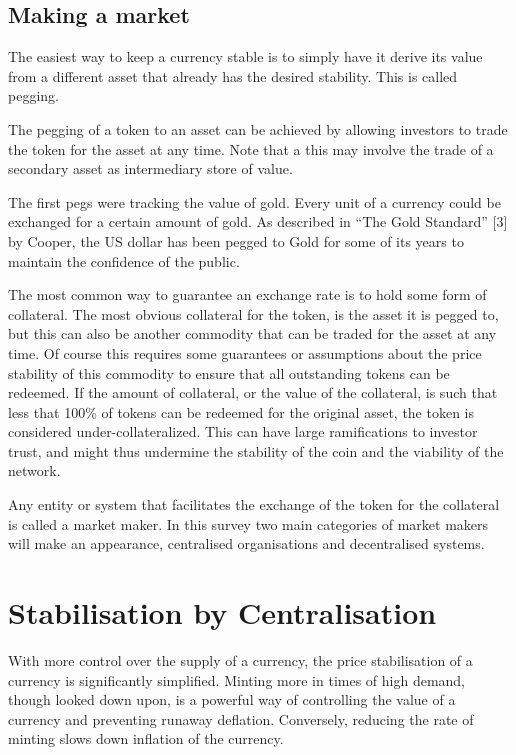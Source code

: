 \documentclass[english,]{IEEEtran}
\begin{document}
\subsection{Making a market}\label{making-a-market}

The easiest way to keep a currency stable is to simply have it derive
its value from a different asset that already has the desired stability.
This is called pegging.

The pegging of a token to an asset can be achieved by allowing investors
to trade the token for the asset at any time. Note that a this may
involve the trade of a secondary asset as intermediary store of value.

The first pegs were tracking the value of gold. Every unit of a currency
could be exchanged for a certain amount of gold. As described in ``The
Gold Standard'' {[}3{]} by Cooper, the US dollar has been pegged to Gold
for some of its years to maintain the confidence of the public.

The most common way to guarantee an exchange rate is to hold some form
of collateral. The most obvious collateral for the token, is the asset
it is pegged to, but this can also be another commodity that can be
traded for the asset at any time. Of course this requires some
guarantees or assumptions about the price stability of this commodity to
ensure that all outstanding tokens can be redeemed. If the amount of
collateral, or the value of the collateral, is such that less that 100\%
of tokens can be redeemed for the original asset, the token is
considered under-collateralized. This can have large ramifications to
investor trust, and might thus undermine the stability of the coin and
the viability of the network.

Any entity or system that facilitates the exchange of the token for the
collateral is called a market maker. In this survey two main categories
of market makers will make an appearance, centralised organisations and
decentralised systems.

\section{Stabilisation by
Centralisation}\label{stabilisation-by-centralisation}

With more control over the supply of a currency, the price stabilisation
of a currency is significantly simplified. Minting more in times of high
demand, though looked down upon, is a powerful way of controlling the
value of a currency and preventing runaway deflation. Conversely,
reducing the rate of minting slows down inflation of the currency.
\end{document}
